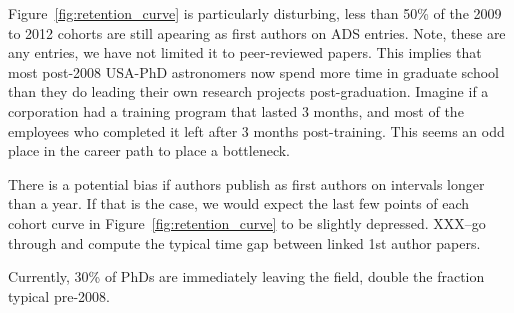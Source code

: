 \documentclass[preprint2]{aastex}
\begin{document}






Figure~\ref{fig:retention_curve} is particularly disturbing, less than 50\% of the 2009 to 2012 cohorts are still apearing as first authors on ADS entries. Note, these are any entries, we have not limited it to peer-reviewed papers.  This implies that most post-2008 USA-PhD astronomers now spend more time in graduate school than they do leading their own research projects post-graduation. Imagine if a corporation had a training program that lasted 3 months, and most of the employees who completed it left after 3 months post-training.  This seems an odd place in the career path to place a bottleneck.

There is a potential bias if authors publish as first authors on intervals longer than a year.  If that is the case, we would expect the last few points of each cohort curve in Figure~\ref{fig:retention_curve} to be slightly depressed.  XXX--go through and compute the typical time gap between linked 1st author papers.  

Currently, 30\% of PhDs are immediately leaving the field, double the fraction typical pre-2008.  
\end{document}
